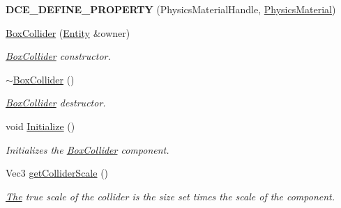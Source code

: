 \begin{DoxyCompactItemize}
\item 
\hypertarget{classDCEngine_1_1Components_1_1BoxCollider_a17f316dd11005453ab43a60f0fef8631}{{\bfseries D\-C\-E\-\_\-\-D\-E\-F\-I\-N\-E\-\_\-\-P\-R\-O\-P\-E\-R\-T\-Y} (Physics\-Material\-Handle, \hyperlink{classDCEngine_1_1PhysicsMaterial}{Physics\-Material})}\label{classDCEngine_1_1Components_1_1BoxCollider_a17f316dd11005453ab43a60f0fef8631}

\item 
\hyperlink{classDCEngine_1_1Components_1_1BoxCollider_a4a0c74f19d98ae6e7f8fabda9c27ae7f}{Box\-Collider} (\hyperlink{classDCEngine_1_1Entity}{Entity} \&owner)
\begin{DoxyCompactList}\small\item\em \hyperlink{classDCEngine_1_1Components_1_1BoxCollider}{Box\-Collider} constructor. \end{DoxyCompactList}\item 
\hypertarget{classDCEngine_1_1Components_1_1BoxCollider_a7dded57707b25afe86b8682cf75685ae}{\hyperlink{classDCEngine_1_1Components_1_1BoxCollider_a7dded57707b25afe86b8682cf75685ae}{$\sim$\-Box\-Collider} ()}\label{classDCEngine_1_1Components_1_1BoxCollider_a7dded57707b25afe86b8682cf75685ae}

\begin{DoxyCompactList}\small\item\em \hyperlink{classDCEngine_1_1Components_1_1BoxCollider}{Box\-Collider} destructor. \end{DoxyCompactList}\item 
\hypertarget{classDCEngine_1_1Components_1_1BoxCollider_a09d8d301ee2e4c210dc7a57f5446441c}{void \hyperlink{classDCEngine_1_1Components_1_1BoxCollider_a09d8d301ee2e4c210dc7a57f5446441c}{Initialize} ()}\label{classDCEngine_1_1Components_1_1BoxCollider_a09d8d301ee2e4c210dc7a57f5446441c}

\begin{DoxyCompactList}\small\item\em Initializes the \hyperlink{classDCEngine_1_1Components_1_1BoxCollider}{Box\-Collider} component. \end{DoxyCompactList}\item 
Vec3 \hyperlink{classDCEngine_1_1Components_1_1BoxCollider_a09020ab4374fdfdd670d0ec788e1dd56}{get\-Collider\-Scale} ()
\begin{DoxyCompactList}\small\item\em \hyperlink{classThe}{The} true scale of the collider is the size set times the scale of the component. \end{DoxyCompactList}\end{DoxyCompactItemize}
